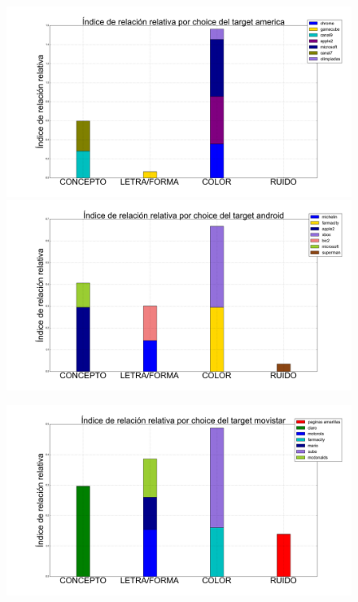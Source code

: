 \documentclass{beamer}
\begin{document}
\begin{frame}
\begin{figure}[h]
\begin{minipage}[c]{1\textwidth}
  \end{minipage}
\end{figure}
\end{frame}

\begin{frame}
\begin{figure}[h]
 \centering
  \begin{minipage}[c]{1\textwidth}
	\includegraphics[scale=0.108]{america.png}
	\includegraphics[scale=0.108]{android.png}
  \end{minipage}
  \begin{minipage}[c]{1\textwidth}
	\includegraphics[scale=0.108]{movistar.png}

\end{minipage}
\end{figure}
\end{frame}
\end{document}
